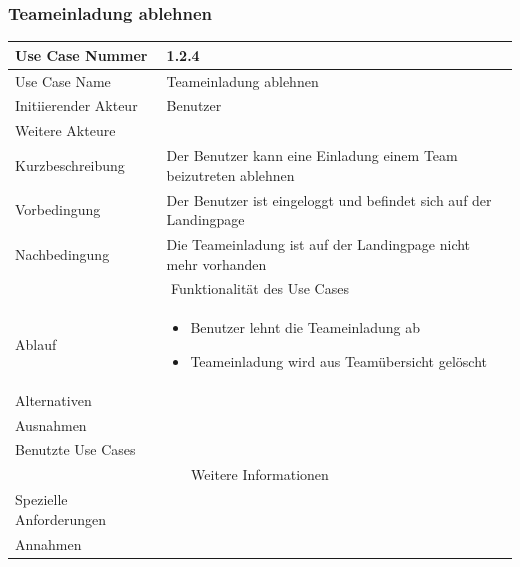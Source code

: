 \documentclass[10pt,a4paper]{article}
\begin{document}
		\subsubsection{Teameinladung ablehnen}
		\begin{tabularx}{\textwidth}{|l|X|}
			\hline Use Case Nummer & 1.2.4 \\ 
			\hline Use Case Name & Teameinladung ablehnen \\ 
			\hline Initiierender Akteur & Benutzer \\
			\hline Weitere Akteure & \\
			\hline Kurzbeschreibung & Der Benutzer kann eine Einladung einem Team beizutreten ablehnen \\
			\hline Vorbedingung & Der Benutzer ist eingeloggt und befindet sich auf der Landingpage \\
			\hline Nachbedingung & Die Teameinladung ist auf der Landingpage nicht mehr vorhanden \\
			\hline \multicolumn{2}{|c|}{Funktionalität des Use Cases}\\
			\hline Ablauf & \begin{itemize}
				\item Benutzer lehnt die Teameinladung ab
				\item Teameinladung wird aus Teamübersicht gelöscht
			\end{itemize} \\
			\hline Alternativen & \\
			\hline Ausnahmen & \\
			\hline Benutzte Use Cases & \\
			\hline \multicolumn{2}{|c|}{Weitere Informationen} \\
			\hline Spezielle Anforderungen & \\
			\hline Annahmen & \\
			\hline
		\end{tabularx}
				
\end{document}
